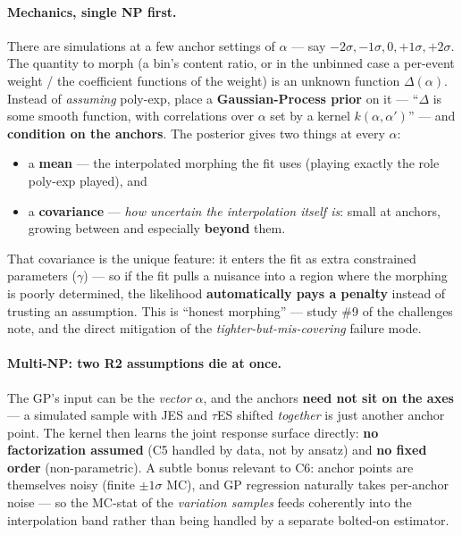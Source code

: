 \documentclass[11pt]{article}
\begin{document}
\paragraph{Mechanics, single NP first.} There are simulations at a few anchor settings of $\alpha$ --- say
$-2\sigma,-1\sigma,0,+1\sigma,+2\sigma$. The quantity to morph (a bin's content ratio, or in the unbinned case
a per-event weight / the coefficient functions of the weight) is an unknown function $\Delta(\alpha)$. Instead
of \emph{assuming} poly-exp, place a \textbf{Gaussian-Process prior} on it --- ``$\Delta$ is some smooth
function, with correlations over $\alpha$ set by a kernel $k(\alpha,\alpha')$'' --- and \textbf{condition on
the anchors}. The posterior gives two things at every $\alpha$:
\begin{itemize}
\item a \textbf{mean} --- the interpolated morphing the fit uses (playing exactly the role poly-exp played), and
\item a \textbf{covariance} --- \emph{how uncertain the interpolation itself is}: small at anchors, growing
  between and especially \textbf{beyond} them.
\end{itemize}
That covariance is the unique feature: it enters the fit as extra constrained parameters ($\gamma$) --- so if
the fit pulls a nuisance into a region where the morphing is poorly determined, the likelihood
\textbf{automatically pays a penalty} instead of trusting an assumption. This is ``honest morphing'' --- study
\#9 of the challenges note, and the direct mitigation of the \emph{tighter-but-mis-covering} failure mode.

\paragraph{Multi-NP: two R2 assumptions die at once.} The GP's input can be the \emph{vector} $\alpha$, and the
anchors \textbf{need not sit on the axes} --- a simulated sample with JES and $\tau$ES shifted \emph{together}
is just another anchor point. The kernel then learns the joint response surface directly: \textbf{no
factorization assumed} (C5 handled by data, not by ansatz) and \textbf{no fixed order} (non-parametric). A
subtle bonus relevant to C6: anchor points are themselves noisy (finite $\pm1\sigma$ MC), and GP regression
naturally takes per-anchor noise --- so the MC-stat of the \emph{variation samples} feeds coherently into the
interpolation band rather than being handled by a separate bolted-on estimator.
\end{document}
